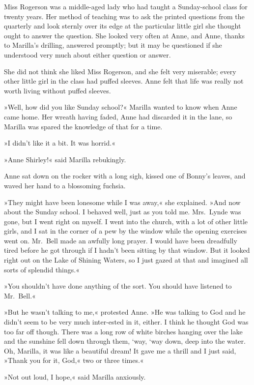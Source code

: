 Miss Rogerson was a middle-aged lady who had taught a Sunday-school class for twenty years. Her method of teaching was to ask the printed questions from the quarterly and look sternly over its edge at the particular little girl she thought ought to answer the question. She looked very often at Anne, and Anne, thanks to Marilla's drilling, answered promptly; but it may be questioned if she understood very much about either question or answer.

She did not think she liked Miss Rogerson, and she felt very miserable; every other little girl in the class had puffed sleeves. Anne felt that life was really not worth living without puffed sleeves.

»Well, how did you like Sunday school?« Marilla wanted to know when Anne came home. Her wreath having faded, Anne had discarded it in the lane, so Marilla was spared the knowledge of that for a time.

»I didn't like it a bit. It was horrid.«

»Anne Shirley!« said Marilla rebukingly.

Anne sat down on the rocker with a long sigh, kissed one of Bonny's leaves, and waved her hand to a blossoming fuchsia.

»They might have been lonesome while I was away,« she explained. »And now about the Sunday school. I behaved well, just as you told me. Mrs.~Lynde was gone, but I went right on myself. I went into the church, with a lot of other little girls, and I sat in the corner of a pew by the window while the opening exercises went on. Mr.~Bell made an awfully long prayer. I would have been dreadfully tired before he got through if I hadn't been sitting by that window. But it looked right out on the Lake of Shining Waters, so I just gazed at that and imagined all sorts of splendid things.«

»You shouldn't have done anything of the sort. You should have listened to Mr.~Bell.«

»But he wasn't talking to me,« protested Anne. »He was talking to God and he didn't seem to be very much inter-ested in it, either. I think he thought God was too far off though. There was a long row of white birches hanging over the lake and the sunshine fell down through them, ‘way, ‘way down, deep into the water. Oh, Marilla, it was like a beautiful dream! It gave me a thrill and I just said, »Thank you for it, God,« two or three times.«

»Not out loud, I hope,« said Marilla anxiously.

